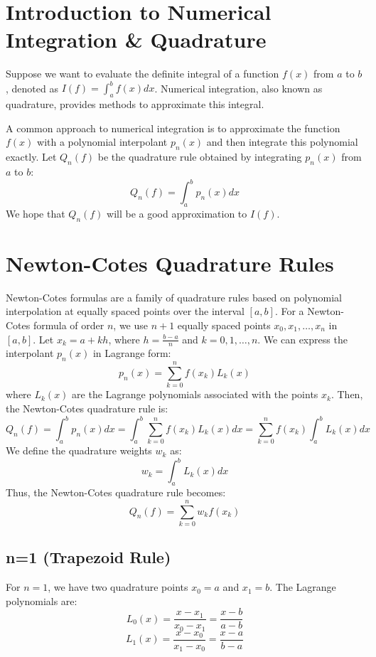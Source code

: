 \documentclass{article}
\begin{document}
\sloppy

\section{Introduction to Numerical Integration \& Quadrature}

Suppose we want to evaluate the definite integral of a function $f(x)$ from $a$ to $b$, denoted as $I(f) = \int_a^b f(x) dx$. Numerical integration, also known as quadrature, provides methods to approximate this integral.

A common approach to numerical integration is to approximate the function $f(x)$ with a polynomial interpolant $p_n(x)$ and then integrate this polynomial exactly. Let $Q_n(f)$ be the quadrature rule obtained by integrating $p_n(x)$ from $a$ to $b$:
\[
Q_n(f) = \int_a^b p_n(x) dx
\]
We hope that $Q_n(f)$ will be a good approximation to $I(f)$.

\section{Newton-Cotes Quadrature Rules}

Newton-Cotes formulas are a family of quadrature rules based on polynomial interpolation at equally spaced points over the interval $[a, b]$. For a Newton-Cotes formula of order $n$, we use $n+1$ equally spaced points $x_0, x_1, \dots, x_n$ in $[a, b]$. Let $x_k = a + kh$, where $h = \frac{b-a}{n}$ and $k = 0, 1, \dots, n$. We can express the interpolant $p_n(x)$ in Lagrange form:
\[
p_n(x) = \sum_{k=0}^{n} f(x_k) L_k(x)
\]
where $L_k(x)$ are the Lagrange polynomials associated with the points $x_k$.
Then, the Newton-Cotes quadrature rule is:
\[
Q_n(f) = \int_a^b p_n(x) dx = \int_a^b \sum_{k=0}^{n} f(x_k) L_k(x) dx = \sum_{k=0}^{n} f(x_k) \int_a^b L_k(x) dx
\]
We define the quadrature weights $w_k$ as:
\[
w_k = \int_a^b L_k(x) dx
\]
Thus, the Newton-Cotes quadrature rule becomes:
\[
Q_n(f) = \sum_{k=0}^{n} w_k f(x_k)
\]

\subsection{n=1 (Trapezoid Rule)}

For $n=1$, we have two quadrature points $x_0 = a$ and $x_1 = b$. The Lagrange polynomials are:
\[
L_0(x) = \frac{x - x_1}{x_0 - x_1} = \frac{x - b}{a - b}
\]
\[
L_1(x) = \frac{x - x_0}{x_1 - x_0} = \frac{x - a}{b - a}
\]
\end{document}
